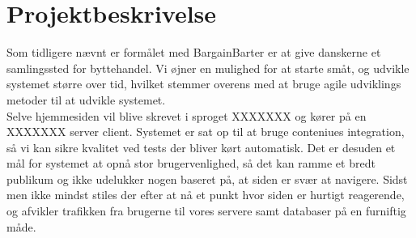 \chapter{Projektbeskrivelse}\label{ch:Projektbeskrivelse}
Som tidligere nævnt er formålet med BargainBarter er at give danskerne et samlingssted for byttehandel. 
Vi øjner en mulighed for at starte småt, og udvikle systemet større over tid, hvilket stemmer overens med at bruge agile udviklings metoder til at udvikle systemet. \\ Selve hjemmesiden vil blive skrevet i sproget XXXXXXX og kører på en XXXXXXX server client. Systemet er sat op til at bruge conteniues integration, så vi kan sikre kvalitet ved tests der bliver kørt automatisk. Det er desuden et mål for systemet at opnå stor brugervenlighed, så det kan ramme et bredt publikum og ikke udelukker nogen baseret på, at siden er svær at navigere. Sidst men ikke mindst stiles der efter at nå et punkt hvor siden er hurtigt reagerende, og afvikler trafikken fra brugerne til vores servere samt databaser på en furniftig måde. 


